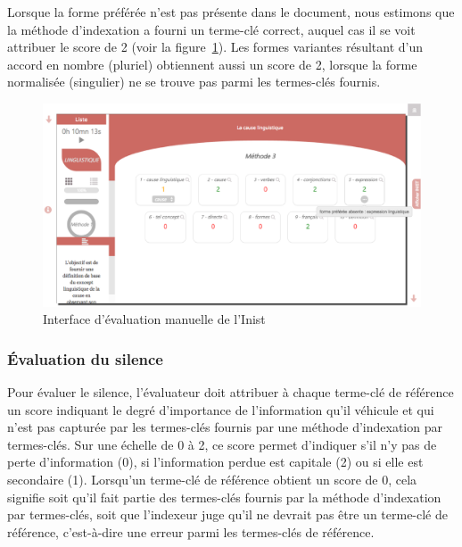         Lorsque la forme préférée n'est pas présente dans le document, nous
        estimons que la méthode d'indexation a fourni un terme-clé correct,
        auquel cas il se voit attribuer le score de 2 (voir la
        figure~\ref{fig:idefix}). Les formes variantes résultant d'un accord en
        nombre (pluriel) obtiennent aussi un score de 2, lorsque la forme
        normalisée (singulier) ne se trouve pas parmi les termes-clés fournis.
        \begin{figure}
          \includegraphics[width=\linewidth]{include/idefix.eps}
          \caption{Interface d'évaluation manuelle de l'Inist
                   \label{fig:idefix}}
        \end{figure}

      \subsubsection{Évaluation du silence}
      \label{subsubsec:main-automatic_evaluation_of_keyphrase_annotation-methodology-evaluation_protocol-silence}
        Pour évaluer le silence, l'évaluateur doit attribuer à chaque terme-clé
        de référence un score indiquant le degré d'importance de l'information
        qu'il véhicule et qui n'est pas capturée par les termes-clés fournis par
        une méthode d'indexation par termes-clés. Sur une échelle de 0 à 2, ce
        score permet d'indiquer s'il n'y pas de perte d'information (0), si
        l'information perdue est capitale (2) ou si elle est secondaire (1).
        Lorsqu'un terme-clé de référence obtient un score de 0, cela signifie
        soit qu'il fait partie des termes-clés fournis par la méthode
        d'indexation par termes-clés, soit que l'indexeur juge qu'il ne devrait
        pas être un terme-clé de référence, c'est-à-dire une erreur parmi les
        termes-clés de référence.

